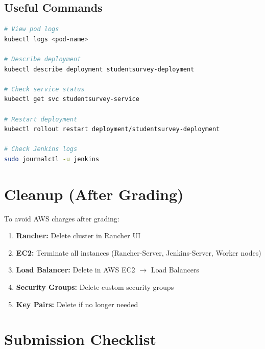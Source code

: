 \documentclass[12pt,a4paper]{article}
\begin{document}
\subsection{Useful Commands}

\begin{lstlisting}[language=bash]
# View pod logs
kubectl logs <pod-name>

# Describe deployment
kubectl describe deployment studentsurvey-deployment

# Check service status
kubectl get svc studentsurvey-service

# Restart deployment
kubectl rollout restart deployment/studentsurvey-deployment

# Check Jenkins logs
sudo journalctl -u jenkins
\end{lstlisting}

\newpage

\section{Cleanup (After Grading)}

To avoid AWS charges after grading:

\begin{enumerate}
    \item \textbf{Rancher:} Delete cluster in Rancher UI
    \item \textbf{EC2:} Terminate all instances (Rancher-Server, Jenkins-Server, Worker nodes)
    \item \textbf{Load Balancer:} Delete in AWS EC2 $\rightarrow$ Load Balancers
    \item \textbf{Security Groups:} Delete custom security groups
    \item \textbf{Key Pairs:} Delete if no longer needed
\end{enumerate}

\newpage

\section{Submission Checklist}
\end{document}
